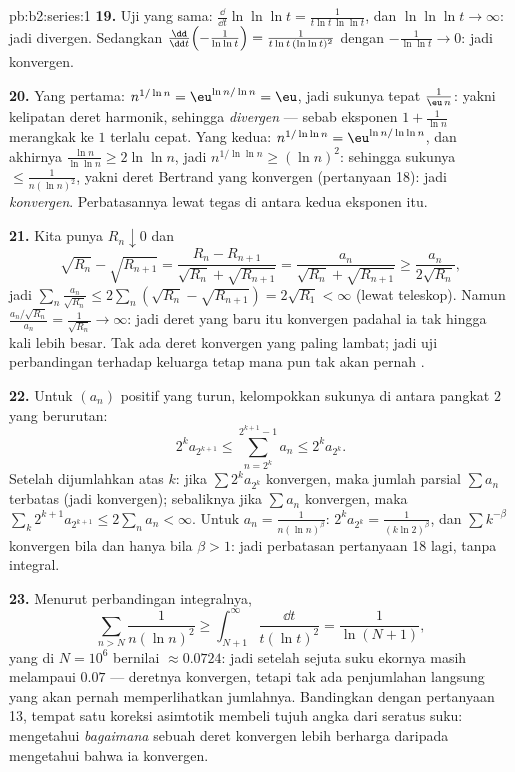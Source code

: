 \begin{solution}{pb:b2:series:1}
\textbf{19.} Uji yang sama: $\frac{\dd}{\dd t}\ln\ln\ln t =
\frac{1}{t\ln t\,\ln\ln t}$, dan $\ln\ln\ln t \to \infty$:
jadi divergen. Sedangkan $\frac{\dd}{\dd
t}\Bigl(-\frac1{\ln\ln t}\Bigr) = \frac{1}{t\ln t\,(\ln\ln t)^2}$
dengan $-\frac1{\ln\ln t} \to 0$: jadi konvergen.

\textbf{20.} Yang pertama: $n^{1/\ln n} = \eu^{\ln n/\ln n} = \eu$, jadi
sukunya tepat $\frac{1}{\eu\,n}$: yakni kelipatan deret
harmonik, sehingga \emph{divergen} --- sebab eksponen $1 +
\frac1{\ln n}$ merangkak ke $1$ terlalu cepat. Yang kedua:
$n^{1/\ln\ln n} = \eu^{\ln n/\ln\ln n}$, dan akhirnya $\frac{\ln
n}{\ln\ln n} \geq 2\ln\ln n$, jadi $n^{1/\ln\ln n} \geq (\ln n)^2$:
sehingga sukunya $\leq \frac1{n(\ln n)^2}$, yakni deret Bertrand yang
konvergen (pertanyaan 18): jadi \emph{konvergen}. Perbatasannya lewat
tegas di antara kedua eksponen itu.

\textbf{21.} Kita punya $R_n \downarrow 0$ dan
\[
\sqrt{R_n} - \sqrt{R_{n+1}} = \frac{R_n -
R_{n+1}}{\sqrt{R_n} + \sqrt{R_{n+1}}} =
\frac{a_n}{\sqrt{R_n} + \sqrt{R_{n+1}}} \geq
\frac{a_n}{2\sqrt{R_n}},
\]
jadi $\sum_n \frac{a_n}{\sqrt{R_n}} \leq 2\sum_n(\sqrt{R_n} -
\sqrt{R_{n+1}}) = 2\sqrt{R_1} < \infty$ (lewat teleskop). Namun
$\frac{a_n/\sqrt{R_n}}{a_n} = \frac1{\sqrt{R_n}} \to \infty$:
jadi deret yang baru itu konvergen padahal ia tak hingga kali lebih
besar. Tak ada deret konvergen yang paling lambat; jadi uji perbandingan
terhadap keluarga tetap mana pun tak akan pernah .

\textbf{22.} Untuk $(a_n)$ positif yang turun, kelompokkan sukunya
di antara pangkat $2$ yang berurutan:
\[
2^{k}a_{2^{k+1}} \leq \sum_{n=2^k}^{2^{k+1}-1} a_n \leq
2^ka_{2^k} .
\]
Setelah dijumlahkan atas $k$: jika $\sum 2^ka_{2^k}$ konvergen, maka
jumlah parsial $\sum a_n$ terbatas (jadi konvergen); sebaliknya jika
$\sum a_n$ konvergen, maka $\sum_k 2^{k+1}a_{2^{k+1}} \leq 2\sum_n a_n <
\infty$. Untuk $a_n = \frac1{n(\ln n)^\beta}$: $2^ka_{2^k} =
\frac{1}{(k\ln 2)^\beta}$, dan $\sum k^{-\beta}$ konvergen bila dan
hanya bila $\beta > 1$: jadi perbatasan pertanyaan 18 lagi, tanpa integral.

\textbf{23.} Menurut perbandingan integralnya,
\[
\sum_{n > N}\frac{1}{n(\ln n)^2} \geq
\int_{N+1}^{\infty}\frac{\dd t}{t(\ln t)^2} =
\frac{1}{\ln(N+1)},
\]
yang di $N = 10^6$ bernilai $\approx 0.0724$: jadi setelah sejuta suku
ekornya masih melampaui $0.07$ --- deretnya konvergen, tetapi tak ada
penjumlahan langsung yang akan pernah memperlihatkan jumlahnya.
Bandingkan dengan pertanyaan 13, tempat satu koreksi asimtotik membeli
tujuh angka dari seratus suku: mengetahui \emph{bagaimana} sebuah deret
konvergen lebih berharga daripada mengetahui bahwa ia konvergen.


\end{solution}
